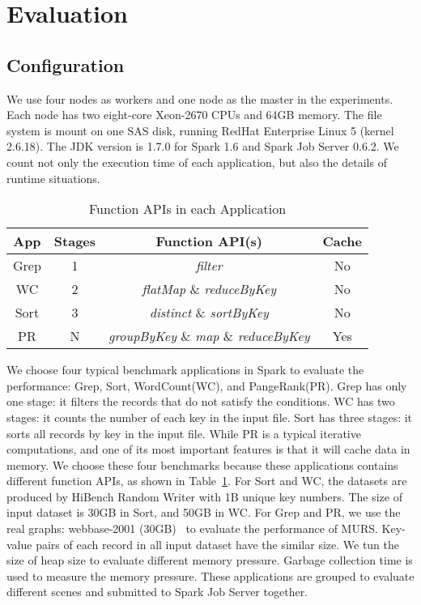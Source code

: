 \section{Evaluation}

\subsection{Configuration}

We use four nodes as workers and one node as the master in the experiments. Each node has two eight-core Xeon-2670 CPUs and 64GB memory. The file system is mount on one SAS disk, running RedHat Enterprise Linux 5 (kernel 2.6.18). The JDK version is 1.7.0 for Spark 1.6 and Spark Job Server 0.6.2. We count not only the execution time of each application, but also the details of runtime situations.

\begin{table}[!t]
\small
\centering
\caption{Function APIs in each Application}
\begin{tabular}{ c | c | c | c }

\hline
\textbf{App} & \textbf{Stages} & \textbf{Function API(s)} & \textbf{Cache} \\
\hline
Grep & 1 & \textit{filter} & No \\
\hline
WC & 2 & \textit{flatMap} \& \textit{reduceByKey} & No \\
\hline
Sort & 3 & \textit{distinct} \& \textit{sortByKey} & No \\
\hline
PR & N & \textit{groupByKey} \& \textit{map} \& \textit{reduceByKey} & Yes \\
\hline

\hline
\end{tabular}
\label{table:app}
\end{table} 

We choose four typical benchmark applications in Spark to evaluate the performance: Grep, Sort, WordCount(WC), and PangeRank(PR). Grep has only one stage: it filters the records that do not satisfy the conditions. WC has two stages: it counts the number of each key in the input file. Sort has three stages: it sorts all records by key in the input file. While PR is a typical iterative computations, and one of its most important features is that it will cache data in memory. We choose these four benchmarks because these applications contains different function APIs, as shown in Table~\ref{table:app}. For Sort  and WC, the datasets are produced by HiBench Random Writer with 1B unique key numbers. The size of input dataset is 30GB in Sort, and 50GB in WC. For Grep and PR, we use the real graphs: webbase-2001 (30GB)~\cite{boldi:webgraph} to evaluate the performance of MURS. Key-value pairs of each record in all input dataset have the similar size. We tun the size of heap size to evaluate different memory pressure. Garbage collection time is used to measure the memory pressure. These applications are grouped to evaluate different scenes and submitted to Spark Job Server together.

